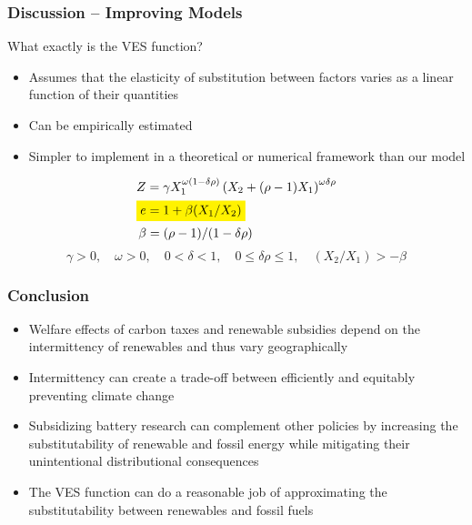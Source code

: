\documentclass[aspectratio=169]{beamer}
\newcommand{\highlight}[2][yellow]{\mathchoice%
	{\colorbox{#1}{$\displaystyle#2$}}%
	{\colorbox{#1}{$\textstyle#2$}}%
	{\colorbox{#1}{$\scriptstyle#2$}}%
	{\colorbox{#1}{$\scriptscriptstyle#2$}}}%
\begin{document}
\begin{frame}
\frametitle{Discussion -- Improving Models}

\begin{block}{What exactly is the VES function?}
	\begin{itemize}
		\setlength\itemsep{0.5em}
		\item Assumes that the elasticity of substitution between factors varies as a linear function of their quantities
		\item Can be empirically estimated
		\item Simpler to implement in a theoretical or numerical framework than our model
	\end{itemize}
	\begin{align*}
	&Z = \gamma X_1^{\omega(1-\delta \rho)} \left( X_2 + (\rho - 1) X_1 \right)^{\omega \delta \rho} \\
	&\highlight{e = 1 + \beta (X_1 / X_2)} \\
	&\,\beta = (\rho - 1) / ( 1- \delta \rho ) 
	\end{align*}
	\vspace{-4ex}
	$$\gamma > 0, \quad \omega > 0, \quad0 < \delta < 1, \quad 0 \leq \delta \rho \leq 1 , \quad (X_2/X_1) >  -\beta $$
\end{block}

\end{frame}

\begin{frame}
\frametitle{Conclusion}

\begin{itemize}
	\setlength\itemsep{0.75em}
	\item Welfare effects of carbon taxes and renewable subsidies depend on the intermittency of renewables and thus vary geographically
	\item Intermittency can create a trade-off between efficiently and equitably preventing climate change
	\item Subsidizing battery research can complement other policies by increasing the substitutability of renewable and fossil energy while mitigating their unintentional distributional consequences 
	\item The VES function can do a reasonable job of approximating the substitutability between renewables and fossil fuels
\end{itemize}

\end{frame}
\end{document}
